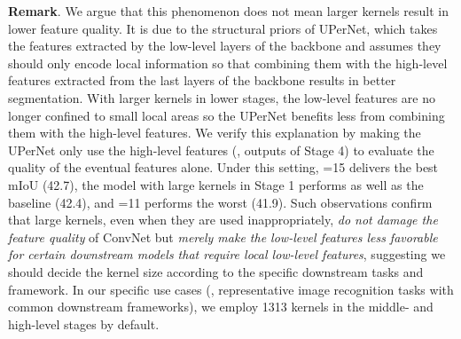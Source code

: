 \documentclass[10pt,twocolumn,letterpaper]{article}
\begin{document}
\noindent\textbf{Remark}. We argue that this phenomenon does not mean larger kernels result in lower feature quality. It is due to the structural priors of UPerNet, which takes the features extracted by the low-level layers of the backbone and assumes they should only encode local information so that combining them with the high-level features extracted from the last layers of the backbone results in better segmentation. With larger kernels in lower stages, the low-level features are no longer confined to small local areas so the UPerNet benefits less from combining them with the high-level features. We verify this explanation by making the UPerNet only use the high-level features (\ie, outputs of Stage 4) to evaluate the quality of the eventual features alone. Under this setting, =15 delivers the best mIoU (42.7), the model with large kernels in Stage 1 performs as well as the baseline (42.4), and =11 performs the worst (41.9). Such observations confirm that large kernels, even when they are used inappropriately, \emph{do not damage the feature quality} of ConvNet but \emph{merely make the low-level features less favorable for certain downstream models that require local low-level features}, suggesting we should decide the kernel size according to the specific downstream tasks and framework. In our specific use cases (\ie, representative image recognition tasks with common downstream frameworks), we employ 1313 kernels in the middle- and high-level stages by default.
\end{document}

